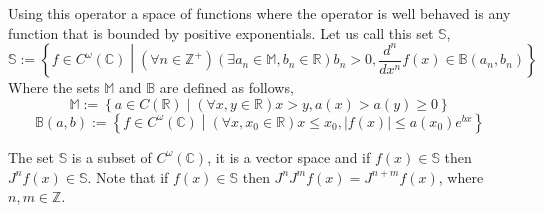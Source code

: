 \documentclass[%
 onecolumn,
 amsmath, amssymb, aps, pra, 10pt
]{revtex4-2}
\begin{document}
Using this operator a space of functions where the operator is well behaved is any function that is bounded by positive exponentials. Let us call this set $\mathbb{S}$,
\begin{equation}
\mathbb{S} := \left\lbrace f \in C^\omega(\mathbb{C}) \middle| (\forall n \in \mathbb{Z}^+)(\exists a_n \in \mathbb{M}, b_n \in \mathbb{R}) b_n > 0, \frac{d^n}{dx^n}f(x) \in \mathbb{B}(a_n, b_n) \right\rbrace
\label{exponentialy_bounded}
\end{equation}
Where the sets $\mathbb{M}$ and $\mathbb{B}$ are defined as follows,
\[\mathbb{M} := \left\lbrace a \in C(\mathbb{R}) \middle| (\forall x, y \in \mathbb{R}) x > y, a(x) > a(y) \geq 0 \right\rbrace\]
\[\mathbb{B}(a, b) := \left\lbrace f \in C^\omega(\mathbb{C}) \middle| (\forall x, x_0 \in \mathbb{R}) x \leq x_0, |f(x)| \leq a(x_0)e^{bx} \right\rbrace\]

The set $\mathbb{S}$ is a subset of $C^{\omega}(\mathbb{C})$, it is a vector space and if $f(x) \in \mathbb{S}$ then $J^n f(x) \in \mathbb{S}$. Note that if $f(x) \in \mathbb{S}$ then $J^n J^m f(x) = J^{n + m} f(x)$, where $n, m \in \mathbb{Z}$.
\end{document}

